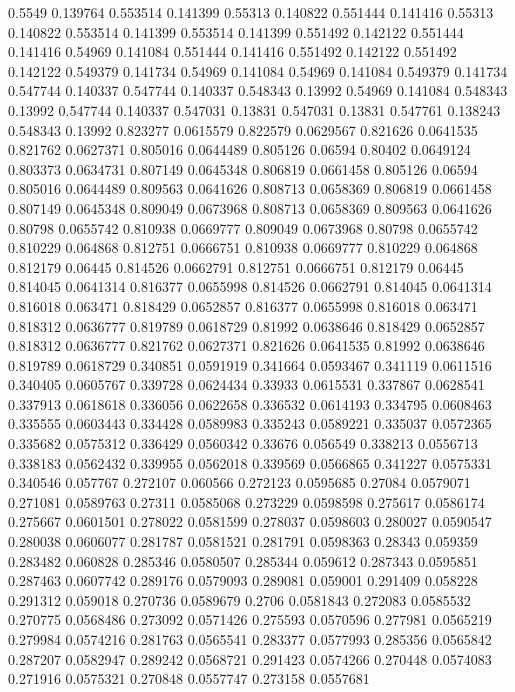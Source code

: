 0.5549 0.139764
0.553514 0.141399
0.55313 0.140822
0.551444 0.141416
0.55313 0.140822
0.553514 0.141399
0.553514 0.141399
0.551492 0.142122
0.551444 0.141416
0.54969 0.141084
0.551444 0.141416
0.551492 0.142122
0.551492 0.142122
0.549379 0.141734
0.54969 0.141084
0.54969 0.141084
0.549379 0.141734
0.547744 0.140337
0.547744 0.140337
0.548343 0.13992
0.54969 0.141084
0.548343 0.13992
0.547744 0.140337
0.547031 0.13831
0.547031 0.13831
0.547761 0.138243
0.548343 0.13992
0.823277 0.0615579
0.822579 0.0629567
0.821626 0.0641535
0.821762 0.0627371
0.805016 0.0644489
0.805126 0.06594
0.80402 0.0649124
0.803373 0.0634731
0.807149 0.0645348
0.806819 0.0661458
0.805126 0.06594
0.805016 0.0644489
0.809563 0.0641626
0.808713 0.0658369
0.806819 0.0661458
0.807149 0.0645348
0.809049 0.0673968
0.808713 0.0658369
0.809563 0.0641626
0.80798 0.0655742
0.810938 0.0669777
0.809049 0.0673968
0.80798 0.0655742
0.810229 0.064868
0.812751 0.0666751
0.810938 0.0669777
0.810229 0.064868
0.812179 0.06445
0.814526 0.0662791
0.812751 0.0666751
0.812179 0.06445
0.814045 0.0641314
0.816377 0.0655998
0.814526 0.0662791
0.814045 0.0641314
0.816018 0.063471
0.818429 0.0652857
0.816377 0.0655998
0.816018 0.063471
0.818312 0.0636777
0.819789 0.0618729
0.81992 0.0638646
0.818429 0.0652857
0.818312 0.0636777
0.821762 0.0627371
0.821626 0.0641535
0.81992 0.0638646
0.819789 0.0618729
0.340851 0.0591919
0.341664 0.0593467
0.341119 0.0611516
0.340405 0.0605767
0.339728 0.0624434
0.33933 0.0615531
0.337867 0.0628541
0.337913 0.0618618
0.336056 0.0622658
0.336532 0.0614193
0.334795 0.0608463
0.335555 0.0603443
0.334428 0.0589983
0.335243 0.0589221
0.335037 0.0572365
0.335682 0.0575312
0.336429 0.0560342
0.33676 0.056549
0.338213 0.0556713
0.338183 0.0562432
0.339955 0.0562018
0.339569 0.0566865
0.341227 0.0575331
0.340546 0.057767
0.272107 0.060566
0.272123 0.0595685
0.27084 0.0579071
0.271081 0.0589763
0.27311 0.0585068
0.273229 0.0598598
0.275617 0.0586174
0.275667 0.0601501
0.278022 0.0581599
0.278037 0.0598603
0.280027 0.0590547
0.280038 0.0606077
0.281787 0.0581521
0.281791 0.0598363
0.28343 0.059359
0.283482 0.060828
0.285346 0.0580507
0.285344 0.059612
0.287343 0.0595851
0.287463 0.0607742
0.289176 0.0579093
0.289081 0.059001
0.291409 0.058228
0.291312 0.059018
0.270736 0.0589679
0.2706 0.0581843
0.272083 0.0585532
0.270775 0.0568486
0.273092 0.0571426
0.275593 0.0570596
0.277981 0.0565219
0.279984 0.0574216
0.281763 0.0565541
0.283377 0.0577993
0.285356 0.0565842
0.287207 0.0582947
0.289242 0.0568721
0.291423 0.0574266
0.270448 0.0574083
0.271916 0.0575321
0.270848 0.0557747
0.273158 0.0557681

